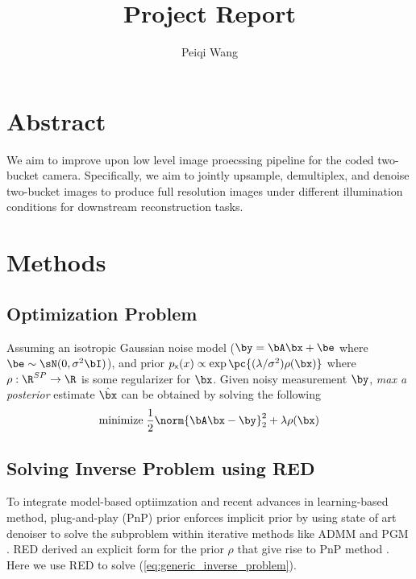 \documentclass[11pt]{article}
\title{Project Report}
\author{Peiqi Wang}
\newcommand\rx{\ensuremath{\mathsf{x}}}
\begin{document}
\maketitle
\newpage 
\tableofcontents
\newpage


\section{Abstract}
We aim to improve upon low level image proecssing pipeline for the coded two-bucket camera. Specifically, we aim to jointly upsample, demultiplex, and denoise two-bucket images to produce full resolution images under different illumination conditions for downstream reconstruction tasks.





\section{Methods}


\subsection{Optimization Problem}

Assuming an isotropic Gaussian noise model ($\by=\bA\bx + \be$ where $\be\sim \sN(0,\sigma^2 \bI)$), and prior $p_{\rx}(x) \propto \exp\pc{ (\lambda/\sigma^2) \rho(\bx) }$ where $\rho:\R^{SP}\to\R$ is some regularizer for $\bx$. Given noisy measurement $\by$, \textit{max a posterior} estimate $\hat{\bx}$ can be obtained by solving the following
\begin{align}
    \text{minimize}\;
        \frac{1}{2} \norm{\bA\bx-\by}_2^2 + \lambda \rho(\bx)
    \label{eq:generic_inverse_problem}
\end{align}

\subsection{Solving Inverse Problem using RED}

To integrate model-based optiimzation and recent advances in learning-based method, plug-and-play (PnP) prior enforces implicit prior by using state of art denoiser to solve the subproblem within iterative methods like ADMM and PGM \cite{venkatakrishnanPlugandPlayPriorsModel2013}. RED derived an explicit form for the prior $\rho$ that give rise to PnP method \cite{romanoLittleEngineThat2016}. Here we use RED to solve (\ref{eq:generic_inverse_problem}).
\end{document}
